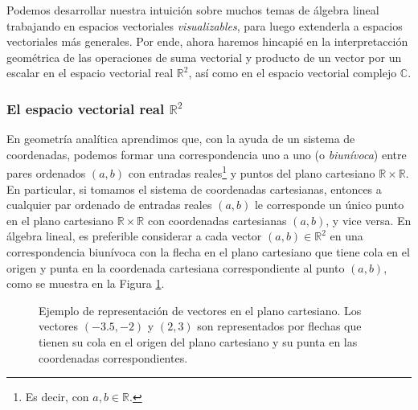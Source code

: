 \documentclass[notasLineal]{subfiles}
\begin{document}
Podemos desarrollar nuestra intuición sobre muchos temas de álgebra lineal trabajando en espacios vectoriales \emph{visualizables}, para luego extenderla a espacios vectoriales más generales. Por ende, ahora haremos hincapié en la interpretacción geométrica de las operaciones de suma vectorial y producto de un vector por un escalar en el espacio vectorial real $\mathbb{R}^2$, así como en el espacio vectorial complejo $\mathbb{C}$.


\subsubsection*{El espacio vectorial real \texorpdfstring{$\mathbb{R}^2$}{TEXT}} \label{Sssec: El espacio vectorial real R^2}

En geometría analítica aprendimos que, con la ayuda de un sistema de coordenadas, podemos formar una correspondencia uno a uno (o \emph{biunívoca}) entre pares ordenados $(a,b)$ con entradas reales\footnote{Es decir, con $a,b\in\mathbb{R}$.} y puntos del plano cartesiano $\mathbb{R}\times\mathbb{R}$. En particular, si tomamos el sistema de coordenadas cartesianas, entonces a cualquier par ordenado de entradas reales $(a,b)$ le corresponde un único punto en el plano cartesiano $\mathbb{R}\times\mathbb{R}$ con coordenadas cartesianas $(a,b)$, y vice versa. En álgebra lineal, es preferible considerar a cada vector $(a,b)\in\mathbb{R}^2$ en una correspondencia biunívoca con la flecha en el plano cartesiano que tiene cola en el origen y punta en la coordenada cartesiana correspondiente al punto $(a,b)$, como se muestra en la Figura \ref{fig:Correspondencias_del_plano_cartesiano}. \\

\begin{figure}[h!]
    \centering
    \caption{Ejemplo de representación de vectores en el plano cartesiano. Los vectores $(-3.5,-2)$ y $(2,3)$ son representados por flechas que tienen su cola en el origen del plano cartesiano y su punta en las coordenadas correspondientes.}
    \label{fig:Correspondencias_del_plano_cartesiano}
\end{figure}
\end{document}
